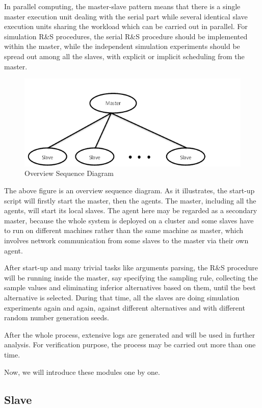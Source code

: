 In parallel computing, the master-slave pattern means that there is a single master execution unit dealing with the serial part while several identical slave execution units sharing the workload which can be carried out in parallel. For simulation R\&S procedures, the serial R\&S procedure should be implemented within the master, while the independent simulation experiments should be spread out among all the slaves, with explicit or implicit scheduling from the master.

\begin{figure}[ht]
\centering
\includegraphics[width=120mm]{master-slave-brief.png}
\caption{Overview Sequence Diagram}
\end{figure}

The above figure is an overview sequence diagram. As it illustrates, the start-up script will firstly start the master, then the agents. The master, including all the agents, will start its local slaves. The agent here may be regarded as a secondary master, because the whole system is deployed on a cluster and some slaves have to run on different machines rather than the same machine as master, which involves network communication from some slaves to the master via their own agent.

After start-up and many trivial tasks like arguments parsing, the R\&S procedure will be running inside the master, say specifying the sampling rule, collecting the sample values and eliminating inferior alternatives based on them, until the best alternative is selected. During that time, all the slaves are doing simulation experiments again and again, against different alternatives and with different random number generation seeds.

After the whole process, extensive logs are generated and will be used in further analysis. For verification purpose, the process may be carried out more than one time.

Now, we will introduce these modules one by one.

\subsection{Slave}

